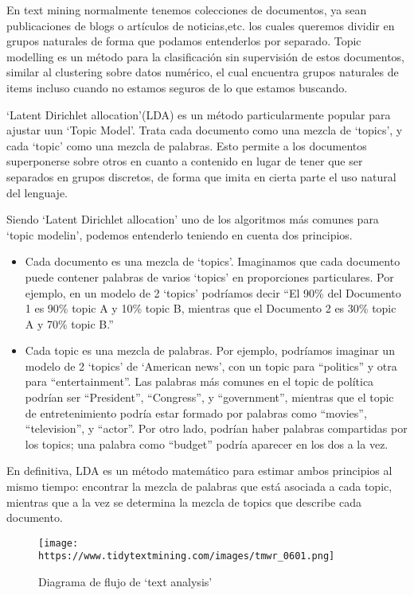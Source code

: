 \documentclass[
]{book}
\begin{document}
En text mining normalmente tenemos colecciones de documentos, ya sean publicaciones de blogs o artículos de noticias,etc. los cuales queremos dividir en grupos naturales de forma que podamos entenderlos por separado. Topic modelling es un método para la clasificación sin supervisión de estos documentos, similar al clustering sobre datos numérico, el cual encuentra grupos naturales de items incluso cuando no estamos seguros de lo que estamos buscando.

`Latent Dirichlet allocation'(LDA) es un método particularmente popular para ajustar uun `Topic Model'. Trata cada documento como una mezcla de `topics', y cada `topic' como una mezcla de palabras. Esto permite a los documentos superponerse sobre otros en cuanto a contenido en lugar de tener que ser separados en grupos discretos, de forma que imita en cierta parte el uso natural del lenguaje.

Siendo `Latent Dirichlet allocation' uno de los algoritmos más comunes para `topic modelin', podemos entenderlo teniendo en cuenta dos principios.

\begin{itemize}
\item
  Cada documento es una mezcla de `topics'. Imaginamos que cada documento puede contener palabras de varios `topics' en proporciones particulares. Por ejemplo, en un modelo de 2 `topics' podríamos decir ``El 90\% del Documento 1 es 90\% topic A y 10\% topic B, mientras que el Documento 2 es 30\% topic A y 70\% topic B.''
\item
  Cada topic es una mezcla de palabras. Por ejemplo, podríamos imaginar un modelo de 2 `topics' de `American news', con un topic para ``politics'' y otra para ``entertainment''. Las palabras más comunes en el topic de política podrían ser ``President'', ``Congress'', y ``government'', mientras que el topic de entretenimiento podría estar formado por palabras como ``movies'', ``television'', y ``actor''. Por otro lado, podrían haber palabras compartidas por los topics; una palabra como ``budget'' podría aparecer en los dos a la vez.
\end{itemize}

En definitiva, LDA es un método matemático para estimar ambos principios al mismo tiempo: encontrar la mezcla de palabras que está asociada a cada topic, mientras que a la vez se determina la mezcla de topics que describe cada documento.

\begin{figure}
\centering
\texttt{[image: https://www.tidytextmining.com/images/tmwr\_0601.png]}
\caption{Diagrama de flujo de `text analysis'}
\end{figure}
\end{document}
